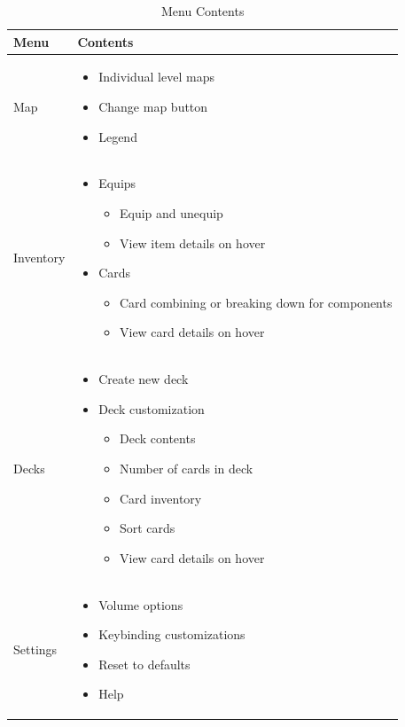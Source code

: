 \documentclass[12pt,titlepage]{article}
\begin{document}
\begin{table}[H]
	\caption{Menu Contents}
	\label{tab:menus}
	\centering
	\begin{tabularx}{\textwidth}{|l|X|}
		\hline
		\textbf{Menu} & \textbf{Contents} \\
		\hline\hline
		Map & \begin{itemize}
			\item Individual level maps
			\item Change map button
			\item Legend
		\end{itemize} \\
		\hline
		Inventory & \begin{itemize}
			\item Equips \begin{itemize}
				\item Equip and unequip
				\item View item details on hover
			\end{itemize}
			\item Cards \begin{itemize}
				\item Card combining or breaking down for components
				\item View card details on hover
			\end{itemize}
		\end{itemize} \\
	\hline
		Decks & \begin{itemize}
			\item Create new deck
			\item Deck customization \begin{itemize}
				\item Deck contents
				\item Number of cards in deck
				\item Card inventory
				\item Sort cards
				\item View card details on hover
			\end{itemize}
		\end{itemize} \\
		\hline
		Settings & \begin{itemize}
			\item Volume options
			\item Keybinding customizations
			\item Reset to defaults
			\item Help
		\end{itemize} \\
		\hline
	\end{tabularx}
\end{table}
\end{document}
